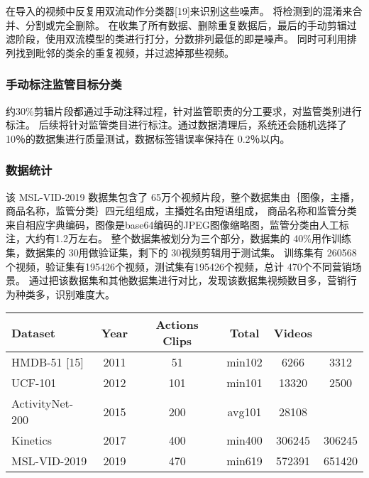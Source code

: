 在导入的视频中反复用双流动作分类器[19]来识别这些噪声。
将检测到的混淆来合并、分割或完全删除。
在收集了所有数据、删除重复数据后，最后的手动剪辑过滤阶段，使用双流模型的类进行打分，分数排列最低的即是噪声。
同时可利用排列找到毗邻的类余的重复视频，并过滤掉那些视频。
	
\subsubsection{手动标注监管目标分类}

约30\%剪辑片段都通过手动注释过程，针对监管职责的分工要求，对监管类别进行标注。
后续将针对监管类目进行标注。通过数据清理后，系统还会随机选择了 10％的数据集进行质量测试，数据标签错误率保持在 0.2％以内。

\subsubsection{数据统计} 
该 MSL-VID-2019 数据集包含了 65万个视频片段，整个数据集由｛图像，主播，商品名称，监管分类｝四元组组成，主播姓名由短语组成，
商品名称和监管分类来自相应字典编码，图像是base64编码的JPEG图像缩略图，监管分类由人工标注，大约有1.2万左右。
整个数据集被划分为三个部分，数据集的 40\%用作训练集，数据集的 30\％用做验证集，剩下的 30\％视频剪辑用于测试集。
训练集有 260568 个视频，验证集有195426个视频，测试集有195426个视频，总计 470个不同营销场景。
通过把该数据集和其他数据集进行对比，发现该数据集视频数目多，营销行为种类多，识别难度大。
\begin{table}[!htbp]
    \label{tab:比较}
    \centering
    \footnotesize%
    \setlength{\tabcolsep}{4pt}%
    \renewcommand{\arraystretch}{1.2}%
    \begin{tabular}{lccccc}
        \hline
        Dataset	& Year &	Actions	Clips &	Total &	Videos \\
        \hline \hline
        HMDB-51 [15] & 2011 & 51 & min102 & 6266 & 3312 \\
        UCF-101 & 2012 & 101 & min101 &13320 & 2500 \\
        ActivityNet-200 & 2015 & 200 &avg101 & 28108 \\
        Kinetics & 2017 & 400 & min400 & 306245 & 306245 \\
        MSL-VID-2019 & 2019 & 470 & min619 & 572391 & 651420 \\
        \hline
    \end{tabular}
\end{table}
    



